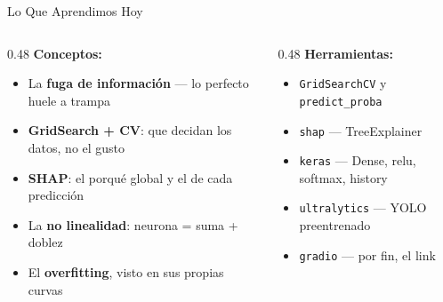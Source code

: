 \documentclass[aspectratio=169, 11pt]{beamer}
\begin{document}
\begin{frame}[shrink=8]{Lo Que Aprendimos Hoy}
  \vspace{-2pt}
  \begin{columns}[T]
    \begin{column}{0.48\textwidth}
      {\small\color{arcaDark}\bfseries\faLightbulb[regular]\hspace{5pt}Conceptos:}
      \vspace{4pt}
      {\footnotesize\color{textMuted}
      \begin{itemize}\setlength{\itemsep}{3pt}
        \item[{\color{codeGreen}\scriptsize\faCheck}]
          La \textbf{fuga de información} --- lo perfecto huele a trampa
        \item[{\color{codeGreen}\scriptsize\faCheck}]
          \textbf{GridSearch + CV}: que decidan los datos, no el gusto
        \item[{\color{codeGreen}\scriptsize\faCheck}]
          \textbf{SHAP}: el porqué global y el de cada predicción
        \item[{\color{codeGreen}\scriptsize\faCheck}]
          La \textbf{no linealidad}: neurona = suma + doblez
        \item[{\color{codeGreen}\scriptsize\faCheck}]
          El \textbf{overfitting}, visto en sus propias curvas
      \end{itemize}}
    \end{column}
    \begin{column}{0.48\textwidth}
      {\small\color{arcaDark}\bfseries\faTools\hspace{5pt}Herramientas:}
      \vspace{4pt}
      {\footnotesize\color{textMuted}
      \begin{itemize}\setlength{\itemsep}{3pt}
        \item[{\color{arcaRed}\scriptsize\faArrowRight}]
          \texttt{GridSearchCV} y \texttt{predict\_proba}
        \item[{\color{arcaRed}\scriptsize\faArrowRight}]
          \texttt{shap} --- TreeExplainer
        \item[{\color{arcaRed}\scriptsize\faArrowRight}]
          \texttt{keras} --- Dense, relu, softmax, history
        \item[{\color{arcaRed}\scriptsize\faArrowRight}]
          \texttt{ultralytics} --- YOLO preentrenado
        \item[{\color{arcaRed}\scriptsize\faArrowRight}]
          \texttt{gradio} --- por fin, el link

\end{itemize}}
\end{column}
\end{columns}
\end{frame}
\end{document}
